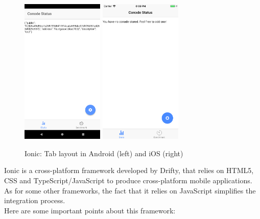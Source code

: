 \documentclass[11pt, a4paper, twoside, openright]{article} %
\begin{document}
{\begin{figure}[!htb]
	\centering
	\includegraphics[width=0.35\textwidth]{img/ionic_layout_android.png}
	\includegraphics[width=0.35\textwidth]{img/ionic_layout_ios.png}
	
	\caption{Ionic: Tab layout in Android (left) and iOS (right)}
	\label{fig:ionic_layout_comparison}
\end{figure}

Ionic is a cross-platform framework developed by Drifty, that relies on HTML5, CSS and TypeScript/JavaScript to produce cross-platform mobile applications. As for some other frameworks, the fact that it relies on JavaScript simplifies the integration process.\\

Here are some important points about this framework:

}
\end{document}
